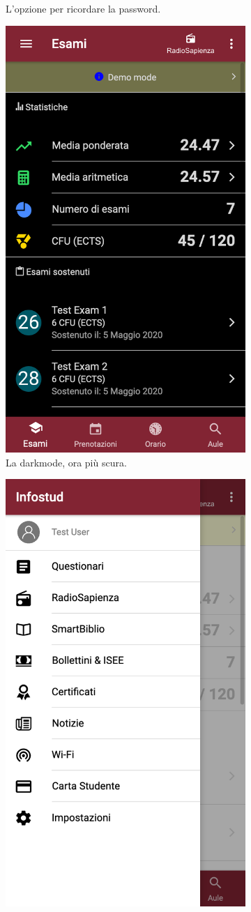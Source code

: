 \documentclass[Lau, oneside, noexaminfo]{sapthesis}%
\begin{document}
\begin{figure}[H]
\begin{subfigure}{0.6\textwidth}
		\caption{L'opzione per ricordare la password.}
	\end{subfigure}
	\begin{subfigure}{0.6\textwidth}
		\centering
		\includegraphics[width=0.5\linewidth]{issues/darkmode}  
		\caption{La darkmode, ora più scura.}
	\end{subfigure}
	\begin{subfigure}{0.6\textwidth}
		\centering
		\includegraphics[width=0.5\linewidth]{issues/propic-1}

\end{subfigure}
\end{figure}
\end{document}
